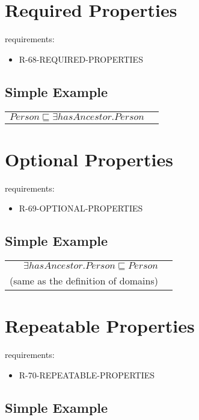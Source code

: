 \documentclass{llncs}
\newenvironment{DL}{
	\begin{center}
  \begin{tabular}{r l}

}{
  \end{tabular}
	\end{center}
}
\begin{document}
\section{Required Properties}

requirements:

\begin{itemize}
	\item R-68-REQUIRED-PROPERTIES
\end{itemize}



\subsection{Simple Example}

\begin{DL}
$Person \sqsubseteq \exists hasAncestor.Person$
\end{DL}

\section{Optional Properties}

requirements:

\begin{itemize}
	\item R-69-OPTIONAL-PROPERTIES
\end{itemize}



\subsection{Simple Example}

\begin{DL}
$\exists hasAncestor.Person \sqsubseteq Person$ \\
(same as the definition of domains)
\end{DL}


\section{Repeatable Properties}

requirements:

\begin{itemize}
	\item R-70-REPEATABLE-PROPERTIES
\end{itemize}



\subsection{Simple Example}
\end{document}
